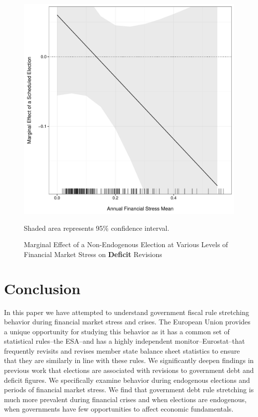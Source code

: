 \documentclass[]{article}
\begin{document}
\begin{figure}
    \caption{Marginal Effect of a Non-Endogenous Election at Various Levels of Financial Market Stress on \textbf{Deficit} Revisions}
    \label{me_finstress_non_endog_deficit}
    \begin{center}
        \includegraphics[scale=0.4]{figures/fsi_scheduled_deficit_me.pdf}
    \end{center}

	{\scriptsize{Shaded area represents 95\% confidence interval.}}

\end{figure}


\section{Conclusion}

In this paper we have attempted to understand government fiscal rule stretching behavior during financial market stress and crises. The European Union provides a unique opportunity for studying this behavior as it has a common set of statistical rules--the ESA--and has a highly independent monitor--Eurostat--that frequently revisits and revises member state balance sheet statistics to ensure that they are similarly in line with these rules. We significantly deepen findings in previous work that elections are associated with revisions to government debt and deficit figures. We specifically examine behavior during endogenous elections and periods of financial market stress. We find that government debt rule stretching is much more prevalent during financial crises and when elections are endogenous, when governments have few opportunities to affect economic fundamentals.
\end{document}
